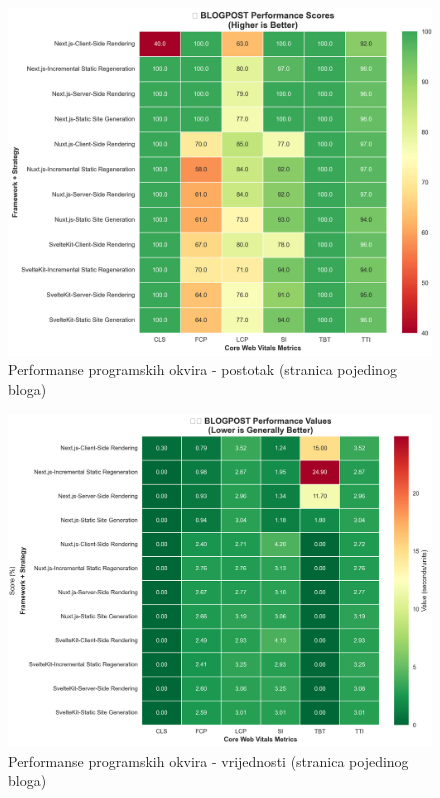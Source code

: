 \begin{figure}[H]
    \centering
    \includegraphics[width=\textwidth]{slike/rezultati/blog-post/blogPost_performance_scores.png}
    \caption{Performanse programskih okvira - postotak (stranica pojedinog bloga) }
    \label{fig:testiranje-blog-post-postotak}
\end{figure}

\begin{figure}[H]
    \centering
    \includegraphics[width=\textwidth]{slike/rezultati/blog-post/blogPost_performance_values.png}
    \caption{Performanse programskih okvira - vrijednosti (stranica pojedinog bloga) }
    \label{fig:testiranje-blog-post-vrijednosti}
\end{figure}

